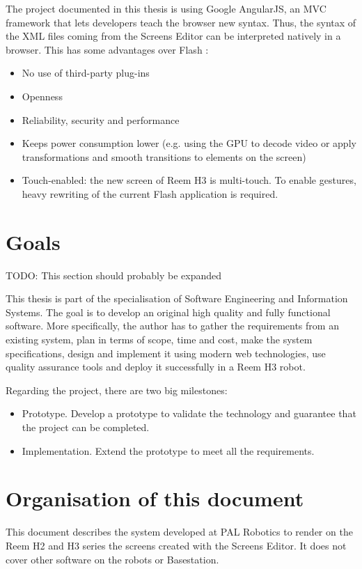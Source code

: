 The project documented in this thesis is using Google AngularJS, an \ac{MVC} framework that lets developers teach the browser new syntax. 
Thus, the syntax of the \ac{XML} files coming from the Screens Editor can be interpreted natively in a browser. 
This has some advantages over Flash \cite{Jobs:ThoughtsOnFlash}:
\begin{itemize}
    \item No use of third-party plug-ins
    \item Openness
    \item Reliability, security and performance
    \item Keeps power consumption lower (e.g. using the GPU to decode video or apply transformations and smooth transitions to elements on the screen)
    \item Touch-enabled: the new screen of Reem H3 is multi-touch. To enable gestures, heavy rewriting of the current Flash application is required.
\end{itemize}


\section{Goals}
TODO: This section should probably be expanded

This thesis is part of the specialisation of Software Engineering and Information Systems. 
The goal is to develop an original high quality and fully functional software. 
More specifically, the author has to gather the requirements from an existing system, plan in terms of scope, time and cost, make the system specifications, design and implement it using modern web technologies, use quality assurance tools and deploy it successfully in a Reem H3 robot.

Regarding the project, there are two big milestones:
\begin{itemize}
    \item Prototype. Develop a prototype to validate the technology and guarantee that the project can be completed.
    \item Implementation. Extend the prototype to meet all the requirements.
\end{itemize}

\section{Organisation of this document}
This document describes the system developed at PAL Robotics to render on the Reem H2 and H3 series the screens created with the Screens Editor.
It does not cover other software on the robots or Basestation.

